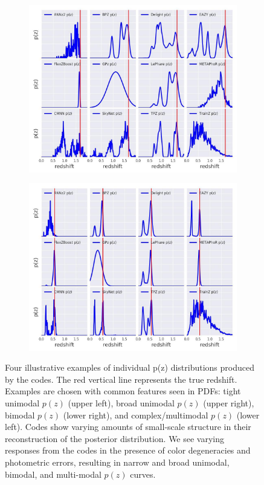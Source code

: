\documentclass[usenatbib]{mn2e}
\begin{document}
\begin{figure}
\begin{subfigure}[b]{0.49\textwidth}
\includegraphics[width=\textwidth]
{figures/pz_12codes_713178_crop.jpg}
\end{subfigure}
\begin{subfigure}[b]{0.49\textwidth}
\includegraphics[width=\textwidth]{figures/pz_12codes_982747_crop.jpg}
\end{subfigure}
\caption{Four illustrative examples of individual p(z) distributions produced by the codes.  The red vertical line represents the true redshift.  Examples are chosen with common features seen in PDFs: tight unimodal $p(z)$ (upper left), broad unimodal $p(z)$ (upper right), bimodal $p(z)$ (lower right), and complex/multimodal $p(z)$ (lower left).  Codes show varying amounts of small-scale structure in their reconstruction of the posterior distribution.  We see varying responses from the codes in the presence of color degeneracies and photometric errors, resulting in narrow and broad unimodal, bimodal, and multi-modal $p(z)$ curves.} \label{fig:pz_examples}
\end{figure}
\end{document}
